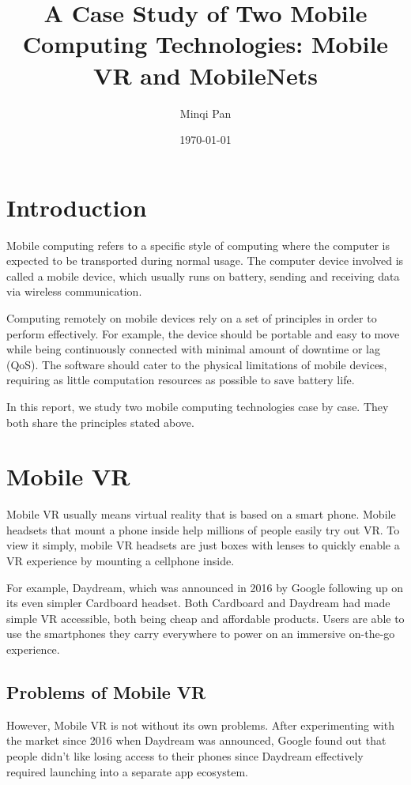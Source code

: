 \documentclass[11pt]{amsart}
\title{A Case Study of Two Mobile Computing Technologies: Mobile VR and MobileNets}
\author{Minqi Pan}
\date{\today}
\begin{document}
\maketitle

\section{Introduction}
Mobile computing refers to a specific style of computing where the computer is expected to be transported during normal usage. The computer device involved is called a mobile device, which usually runs on battery, sending and receiving data via wireless communication. 

Computing remotely on mobile devices rely on a set of principles in order to perform effectively. For example, the device should be portable and easy to move while being continuously connected with minimal amount of downtime or lag (QoS). The software should cater to the physical limitations of mobile devices, requiring as little computation resources as possible to save battery life.

In this report, we study two mobile computing technologies case by case. They both share the principles stated above.

\section{Mobile VR}
Mobile VR usually means virtual reality that is based on a smart phone. Mobile headsets that mount a phone inside help millions of people easily try out VR. To view it simply, mobile VR headsets are just boxes with lenses to quickly enable a VR experience by mounting a cellphone inside.

For example, Daydream, which was announced in 2016 by Google following up on its even simpler Cardboard headset. Both Cardboard and Daydream had made simple VR accessible, both being cheap and affordable products. Users are able to use the smartphones they carry everywhere to power on an immersive on-the-go experience.

\subsection{Problems of Mobile VR}
However, Mobile VR is not without its own problems. After experimenting with the market since 2016 when Daydream was announced, Google found out that people didn't like losing access to their phones since Daydream effectively required launching into a separate app ecosystem.
\end{document}
